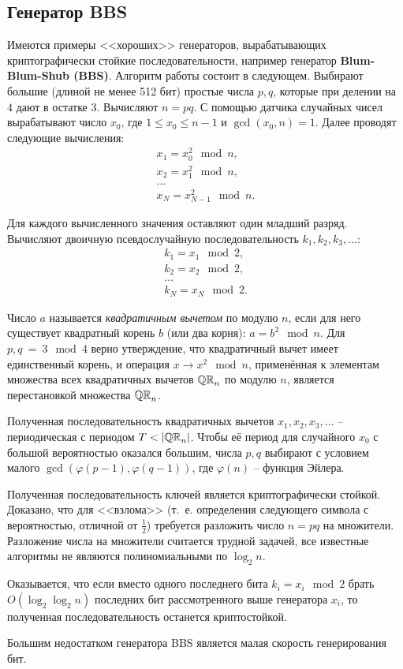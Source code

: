 \subsection{Генератор BBS}

Имеются примеры <<хороших>> генераторов, вырабатывающих криптографически стойкие последовательности, например генератор \textbf{Blum-Blum-Shub (BBS)}. Алгоритм работы состоит в следующем. Выбирают большие (длиной не менее 512 бит) простые числа $p, q$, которые при делении на $4$ дают в остатке $3$. Вычисляют $n = p q$. С помощью датчика случайных чисел вырабатывают число $x_{0}$, где $1 \leq x_0 \leq n-1$ и $\gcd(x_0, n) = 1$. Далее проводят следующие вычисления:
\[ \begin{array}{l}
        x_{1} = x_{0}^{2} \mod n,\\
        x_{2} = x_{1}^{2} \mod n,\\
        \dots\\
        x_{N} = x_{N-1}^{2} \mod n.
\end{array} \]

Для каждого вычисленного значения оставляют один младший разряд. Вычисляют двоичную псевдослучайную последовательность $k_1, k_2, k_3, \dots$:
\[ \begin{array}{l}
        k_{1} = x_{1} \mod 2,\\
        k_{2} = x_{2} \mod 2,\\
        \dots \\
        k_{N} = x_{N} \mod 2.
\end{array} \]

Число $a$ называется \emph{квадратичным вычетом} по модулю $n$, если для него существует квадратный корень $b$ (или два корня): $a = b^2 \mod n$. Для $p,q ~=~ 3 \mod 4$ верно утверждение, что квадратичный вычет имеет единственный корень, и операция $x \rightarrow x^2 \mod n$, применённая к элементам множества всех квадратичных вычетов $\mathbb{QR}_n$ по модулю $n$, является перестановкой множества $\mathbb{QR}_n$.

Полученная последовательность квадратичных вычетов $x_1, x_2, x_3, \dots$ -- периодическая с периодом $T < |\mathbb{QR}_n|$. Чтобы её период для случайного $x_0$ с большой вероятностью оказался большим, числа $p,q$ выбирают с условием малого $\gcd(\varphi(p-1), \varphi(q-1))$, где $\varphi(n)$ -- функция Эйлера.

Полученная последовательность ключей является криптографически стойкой. Доказано, что для <<взлома>> (т.~е. определения следующего символа с вероятностью, отличной от $\frac{1}{2}$) требуется разложить число $n=pq$ на множители. Разложение числа на множители считается трудной задачей, все известные алгоритмы не являются полиномиальными по $\log_2 n$.

Оказывается, что если вместо одного последнего бита $k_i = x_i \mod 2$ брать $O(\log_2 \log_2 n)$ последних бит рассмотренного выше генератора $x_i$, то полученная последовательность останется криптостойкой.

Большим недостатком генератора BBS является малая скорость генерирования бит.
